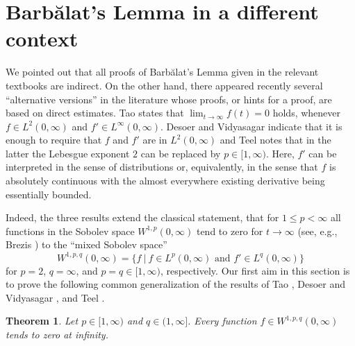 \documentclass[10pt, a4paper, reqno]{amsart}
\theoremstyle{normal}
\newtheorem{thm}{Theorem}
\begin{document}


\section{Barb\u{a}lat's Lemma in a different context}\label{SEC-II}

We pointed out that all proofs of Barb\u{a}lat's Lemma given in the relevant textbooks are indirect. On the other hand, there appeared recently several \textquotedblleft{}alternative versions\textquotedblright{} in the literature whose proofs, or hints for a proof, are based on direct estimates. Tao \cite[Lemma 1]{Tao} states that $\lim_{t\rightarrow\infty}f(t)=0$ holds, whenever $f\in L^2(0,\infty)$ and $f'\in L^{\infty}(0,\infty)$. Desoer and Vidyasagar \cite[Ex.~1 on p.~237]{DV} indicate that it is enough to require that $f$ and $f'$ are in $L^{2}(0,\infty)$ and Teel \cite[Fact 4]{Teel} notes that in the latter the Lebesgue exponent $2$ can be replaced by $p\in [1,\infty)$. Here, $f'$ can be interpreted in the sense of distributions or, equivalently, in the sense that $f$ is absolutely continuous with the almost everywhere existing derivative being essentially bounded.

\smallskip

Indeed, the three results extend the classical statement, that for $1\leqslant{}p<\infty$ all functions in the Sobolev space $W^{1,p}(0,\infty)$ tend to zero for $t\to \infty$ (see, e.g., Brezis \cite[Corollary 8.9]{Brezis}) to the \textquotedblleft{}mixed Sobolev space\textquotedblright{}
$$
W^{1,p,q}(0,\infty)=\bigl\{f\:|\:f\in L^p(0,\infty) \text{ and } f'\in L^q(0,\infty)\bigr\}
$$
for $p=2$, $q=\infty$, and $p=q\in[1,\infty)$, respectively. Our first aim in this section is to prove the following common generalization of the results of Tao \cite{Tao}, Desoer and Vidyasagar \cite{DV}, and Teel \cite{Teel}.
\medskip

\begin{thm}\label{THM-2} Let $p\in [1,\infty)$ and $q\in(1,\infty]$. Every function $f\in W^{1,p,q}(0,\infty)$ tends to zero at infinity.
\end{thm}
\end{document}
